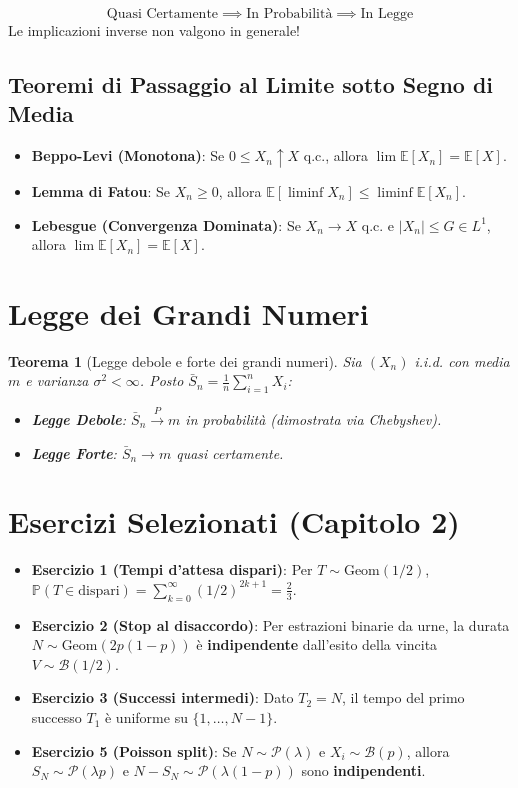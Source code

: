 \documentclass[11pt, a4paper]{report}
\theoremstyle{plain}
\newtheorem{theorem}{Teorema}[chapter]
\theoremstyle{definition}
\theoremstyle{remark}
\newcommand{\PP}{\mathbb{P}}
\newcommand{\E}{\mathbb{E}}
\newcommand{\1}{\mathbf{1}}
\begin{document}
\begin{spiegazione}
    \[ \text{Quasi Certamente} \implies \text{In Probabilità} \implies \text{In Legge} \]
    Le implicazioni inverse non valgono in generale!
\end{spiegazione}

\subsection{Teoremi di Passaggio al Limite sotto Segno di Media}
\begin{itemize}
    \item \textbf{Beppo-Levi (Monotona)}: Se $0 \le X_n \uparrow X$ q.c., allora $\lim \E[X_n] = \E[X]$.
    \item \textbf{Lemma di Fatou}: Se $X_n \ge 0$, allora $\E[\liminf X_n] \le \liminf \E[X_n]$.
    \item \textbf{Lebesgue (Convergenza Dominata)}: Se $X_n \to X$ q.c. e $|X_n| \le G \in L^1$, allora $\lim \E[X_n] = \E[X]$.
\end{itemize}

\section{Legge dei Grandi Numeri}

\begin{theorem}[Legge debole e forte dei grandi numeri]
Sia $(X_n)$ i.i.d. con media $m$ e varianza $\sigma^2 < \infty$. Posto $\bar{S}_n = \frac{1}{n}\sum_{i=1}^n X_i$:
\begin{itemize}
    \item \textbf{Legge Debole}: $\bar{S}_n \stackrel{P}{\to} m$ in probabilità (dimostrata via Chebyshev).
    \item \textbf{Legge Forte}: $\bar{S}_n \to m$ quasi certamente.
\end{itemize}
\end{theorem}

\section{Esercizi Selezionati (Capitolo 2)}
\begin{itemize}
    \item \textbf{Esercizio 1 (Tempi d'attesa dispari)}: Per $T \sim \text{Geom}(1/2)$, $\PP(T \in \text{dispari}) = \sum_{k=0}^\infty (1/2)^{2k+1} = \frac{2}{3}$.
    \item \textbf{Esercizio 2 (Stop al disaccordo)}: Per estrazioni binarie da urne, la durata $N \sim \text{Geom}(2p(1-p))$ è \textbf{indipendente} dall'esito della vincita $V \sim \mathcal{B}(1/2)$.
    \item \textbf{Esercizio 3 (Successi intermedi)}: Dato $T_2=N$, il tempo del primo successo $T_1$ è uniforme su $\{1, \dots, N-1\}$.
    \item \textbf{Esercizio 5 (Poisson split)}: Se $N \sim \mathcal{P}(\lambda)$ e $X_i \sim \mathcal{B}(p)$, allora $S_N \sim \mathcal{P}(\lambda p)$ e $N - S_N \sim \mathcal{P}(\lambda(1-p))$ sono \textbf{indipendenti}.
\end{itemize}
\end{document}
